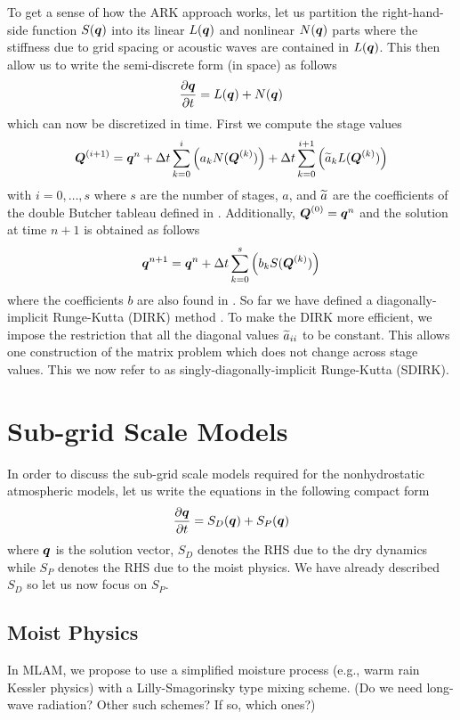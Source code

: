 \documentclass[12pt]{article}
\begin{document}
To get a sense of how the ARK approach works, let us partition the right-hand-side function $S(\mbox{\boldmath$q$\unboldmath})$ into its linear $L(\mbox{\boldmath$q$\unboldmath})$ and nonlinear $N(\mbox{\boldmath$q$\unboldmath})$ parts where the stiffness due to grid spacing or acoustic waves are contained in $L(\mbox{\boldmath$q$\unboldmath})$.  This then allow us to write the semi-discrete form (in space) as follows
\[
\frac{\partial \mbox{\boldmath$q$\unboldmath}}{\partial t} = L(\mbox{\boldmath$q$\unboldmath}) + N(\mbox{\boldmath$q$\unboldmath}) 
\]
which can now be discretized in time.  First we compute the stage values
\[
\mbox{\boldmath$Q$\unboldmath}^{(i+1)}=\mbox{\boldmath$q$\unboldmath}^n + \Delta t \sum_{k=0}^{i} \left( a_k N(\mbox{\boldmath$Q$\unboldmath}^{(k)}) \right) + \Delta t \sum_{k=0}^{i+1} \left( \widetilde{a}_k L(\mbox{\boldmath$Q$\unboldmath}^{(k)}) \right)
\]
with $i=0,\ldots,s$ where $s$ are the number of stages, $a$, and $\widetilde{a}$ are the coefficients of the double Butcher tableau defined in \cite{kennedy:2003,giraldo:2013}.  Additionally, 
$\mbox{\boldmath$Q$\unboldmath}^{(0)}=\mbox{\boldmath$q$\unboldmath}^n$ and the solution at time $n+1$ is obtained as follows
\[
\mbox{\boldmath$q$\unboldmath}^{n+1}=\mbox{\boldmath$q$\unboldmath}^n + \Delta t \sum_{k=0}^{s} \left( b_k S(\mbox{\boldmath$Q$\unboldmath}^{(k)}) \right)
\]
where the coefficients $b$ are also found in \cite{kennedy:2003,giraldo:2013}.
So far we have defined a diagonally-implicit Runge-Kutta (DIRK) method \cite{alexander:1977,butcher:1981a,ascher:1997,boscarino:2009}.  To make the DIRK more efficient, we impose the restriction that all the diagonal values $\widetilde{a}_{ii}$ to be constant. This allows one construction of the matrix problem which does not change across stage values.  This we now refer to as singly-diagonally-implicit Runge-Kutta (SDIRK).


\section{Sub-grid Scale Models}
\label{sec:sgs_models}

In order to discuss the sub-grid scale models required for the nonhydrostatic atmospheric models, let us write the equations in the following compact form  
\[
\frac{\partial \mbox{\boldmath$q$\unboldmath}}{\partial t} = S_D(\mbox{\boldmath$q$\unboldmath}) + S_P(\mbox{\boldmath$q$\unboldmath})
\]
where $\mbox{\boldmath$q$\unboldmath}$ is the solution vector, $S_D$ denotes the RHS due to the dry dynamics while $S_P$ denotes the RHS due to the moist physics. We have already described $S_D$ so let us now focus on $S_P$.

\subsection{Moist Physics}
In MLAM, we propose to use a simplified moisture process (e.g., warm rain Kessler physics) with a Lilly-Smagorinsky type mixing scheme.    (Do we need long-wave radiation? Other such schemes?  If so, which ones?)
\end{document}
